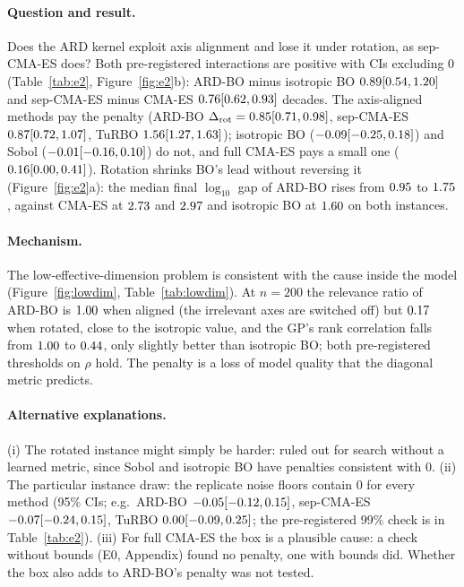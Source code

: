 \documentclass[10pt,a4paper,twocolumn]{article}
\newcommand{\Drot}{\Delta_{\mathrm{rot}}}
\begin{document}
\paragraph{Question and result.}
Does the ARD kernel exploit axis alignment and lose it under rotation, as sep-CMA-ES does? Both pre-registered interactions are positive with CIs excluding 0 (Table~\ref{tab:e2}, Figure~\ref{fig:e2}b): ARD-BO
minus isotropic BO $0.89 [0.54, 1.20]$ and sep-CMA-ES minus CMA-ES $0.76 [0.62, 0.93]$ decades. The axis-aligned methods
pay the penalty (ARD-BO $\Drot=\numdrotboardrotated$, sep-CMA-ES $0.87 [0.72, 1.07]$, TuRBO $1.56 [1.27, 1.63]$);
isotropic BO ($-0.09 [-0.25, 0.18]$) and Sobol ($-0.01 [-0.16, 0.10]$) do not, and full CMA-ES pays a small one
($0.16 [0.00, 0.41]$). Rotation shrinks BO's lead without reversing it (Figure~\ref{fig:e2}a): the median final
$\log_{10}$ gap of ARD-BO rises from $0.95$ to $1.75$, against CMA-ES at
$2.73$ and $2.97$ and isotropic BO at $1.60$ on both instances.

\paragraph{Mechanism.}
The low-effective-dimension problem is consistent with the cause inside the model (Figure~\ref{fig:lowdim}, Table~\ref{tab:lowdim}).
At $n=200$ the relevance ratio of ARD-BO is $1.00$ when aligned (the irrelevant axes are switched
off) but $0.17$ when rotated, close to the isotropic value, and the GP's rank correlation falls from
$1.00$ to $0.44$, only slightly better than isotropic BO; both pre-registered
thresholds on $\rho$ hold. The penalty is a loss of model quality that the diagonal metric predicts.

\paragraph{Alternative explanations.}
(i) The rotated instance might simply be harder: ruled out for search without a learned metric, since Sobol and
isotropic BO have penalties consistent with 0. (ii) The particular instance draw: the replicate noise floors contain 0 for every method
(95\% CIs; e.g.\ ARD-BO $-0.05 [-0.12, 0.15]$, sep-CMA-ES $-0.07 [-0.24, 0.15]$, TuRBO $0.00 [-0.09, 0.25]$;
the pre-registered 99\% check is in Table~\ref{tab:e2}). (iii) For full CMA-ES the box is a plausible cause: a check without bounds (E0, Appendix)
found no penalty, one with bounds did.
Whether the box also adds to ARD-BO's penalty was not tested.
\end{document}
